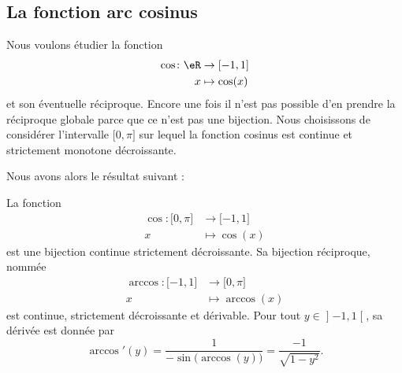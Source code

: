 \subsection{La fonction arc cosinus}

Nous voulons étudier la fonction
\begin{equation}
    \begin{aligned}
        \cos\colon \eR&\to \mathopen[ -1 , 1 \mathclose] \\
        x&\mapsto \cos(x) 
    \end{aligned}
\end{equation}
et son éventuelle réciproque. Encore une fois il n'est pas possible d'en prendre la réciproque globale parce que ce n'est pas une bijection. Nous choisissons de considérer l'intervalle \( \mathopen[ 0 , \pi \mathclose]\) sur lequel la fonction cosinus est continue et strictement monotone décroissante.

Nous avons alors le résultat suivant :

\begin{proposition}
    La fonction
    \begin{equation}
        \begin{aligned}
            \cos\colon \mathopen[ 0 , \pi \mathclose]&\to \mathopen[ -1 , 1 \mathclose] \\
            x&\mapsto \cos(x) 
        \end{aligned}
    \end{equation}
    est une bijection continue strictement décroissante. Sa bijection réciproque, nommée 
    \begin{equation}
        \begin{aligned}
            \arccos\colon \mathopen[ -1 , 1 \mathclose]&\to \mathopen[ 0 , \pi \mathclose] \\
            x&\mapsto \arccos(x) 
        \end{aligned}
    \end{equation}
est continue, strictement décroissante et dérivable. Pour tout \( y\in\mathopen] -1 , 1 \mathclose[\), sa dérivée est donnée par
    \begin{equation}
        \arccos'(y)=\frac{1}{ -\sin\big( \arccos(y) \big) }=\frac{ -1 }{ \sqrt{1-y^2} }.
    \end{equation}
\end{proposition}

